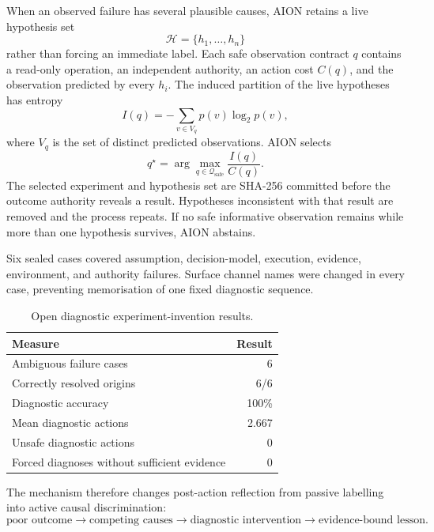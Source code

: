 When an observed failure has several plausible causes, AION retains a live
hypothesis set
\begin{equation}
\mathcal{H}=\{h_1,\ldots,h_n\}
\end{equation}
rather than forcing an immediate label.  Each safe observation contract $q$
contains a read-only operation, an independent authority, an action cost
$C(q)$, and the observation predicted by every $h_i$.  The induced partition
of the live hypotheses has entropy
\begin{equation}
I(q)=-\sum_{v\in V_q}p(v)\log_2 p(v),
\end{equation}
where $V_q$ is the set of distinct predicted observations.  AION selects
\begin{equation}
q^{\star}=\arg\max_{q\in\mathcal{Q}_{\mathrm{safe}}}
\frac{I(q)}{C(q)}.
\label{eq:diagnostic-information-value}
\end{equation}
The selected experiment and hypothesis set are SHA-256 committed before the
outcome authority reveals a result.  Hypotheses inconsistent with that result
are removed and the process repeats.  If no safe informative observation
remains while more than one hypothesis survives, AION abstains.

Six sealed cases covered assumption, decision-model, execution, evidence,
environment, and authority failures.  Surface channel names were changed in
every case, preventing memorisation of one fixed diagnostic sequence.

\begin{table}[htbp]
\centering
\caption{Open diagnostic experiment-invention results.}
\label{tab:open-diagnostic-results}
\begin{tabular}{@{}lr@{}}
\toprule
Measure & Result \\
\midrule
Ambiguous failure cases & 6 \\
Correctly resolved origins & 6/6 \\
Diagnostic accuracy & 100\% \\
Mean diagnostic actions & 2.667 \\
Unsafe diagnostic actions & 0 \\
Forced diagnoses without sufficient evidence & 0 \\
\bottomrule
\end{tabular}
\end{table}

The mechanism therefore changes post-action reflection from passive labelling
into active causal discrimination:
\begin{equation}
\text{poor outcome}
\rightarrow \text{competing causes}
\rightarrow \text{diagnostic intervention}
\rightarrow \text{evidence-bound lesson}.
\end{equation}

